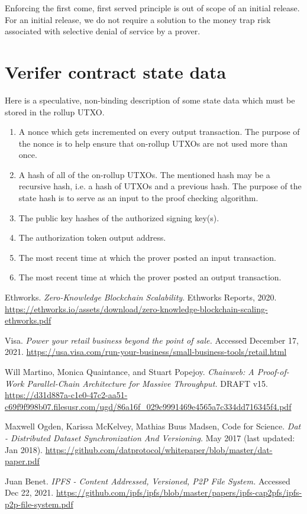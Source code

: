 \documentclass[12pt]{article}
\begin{document}
Enforcing the first come, first served principle is out of scope of an initial release. For an initial release, we do not require a solution to the money trap risk associated with selective denial of service by a prover.


\section{Verifer contract state data}

Here is a speculative, non-binding description of some state data which must be stored in the rollup UTXO.

\begin{enumerate}
	\item A nonce which gets incremented on every output transaction. The purpose of the nonce is to help ensure that on-rollup UTXOs are not used more than once. 
	\item A hash of all of the on-rollup UTXOs. The mentioned hash may be a recursive hash, i.e. a hash of UTXOs and a previous hash. The purpose of the state hash is to serve as an input to the proof checking algorithm.
	\item The public key hashes of the authorized signing key(s).
	\item The authorization token output address.
	\item The most recent time at which the prover posted an input transaction.
	\item The most recent time at which the prover posted an output transaction.
\end{enumerate}




\clearpage


\begin{thebibliography}{3}


		Ethworks. \textit{Zero-Knowledge Blockchain Scalability}. Ethworks Reports, 2020. \url{https://ethworks.io/assets/download/zero-knowledge-blockchain-scaling-ethworks.pdf}

		Visa. \textit{Power your retail business beyond the point of sale.} Accessed December 17, 2021. \url{https://usa.visa.com/run-your-business/small-business-tools/retail.html}

		Will Martino, Monica Quaintance, and Stuart Popejoy. \textit{Chainweb: A Proof-of-Work Parallel-Chain Architecture for Massive Throughput.} DRAFT v15. \url{https://d31d887a-c1e0-47c2-aa51-c69f9f998b07.filesusr.com/ugd/86a16f_029c9991469e4565a7c334dd716345f4.pdf}

		Maxwell Ogden, Karissa McKelvey, Mathias Buus Madsen, Code for Science. \textit{Dat - Distributed Dataset Synchronization And Versioning.} May 2017 (last updated: Jan 2018). \url{https://github.com/datprotocol/whitepaper/blob/master/dat-paper.pdf}

		Juan Benet. \textit{IPFS - Content Addressed, Versioned, P2P File System.} Accessed Dec 22, 2021. \url{https://github.com/ipfs/ipfs/blob/master/papers/ipfs-cap2pfs/ipfs-p2p-file-system.pdf}


\end{thebibliography}
\end{document}
